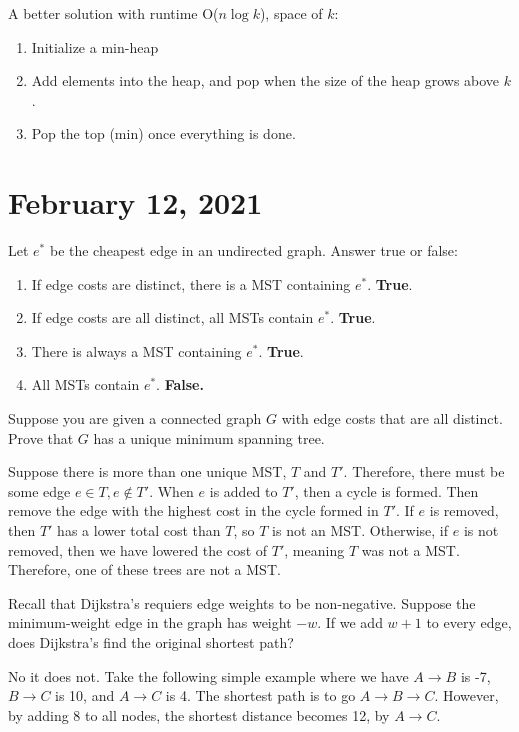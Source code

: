 \documentclass[11pt]{article}
\begin{document}
A better solution with runtime O($n \log k$), space of $k$:
\begin{enumerate}
    \item Initialize a min-heap
    \item Add elements into the heap, and pop when the size of the heap grows above $k$.
    \item Pop the top (min) once everything is done.
\end{enumerate}

\newpage
\section{February 12, 2021}
\begin{exmp}
    Let $e^*$ be the cheapest edge in an undirected graph. Answer true or false: 
    \begin{enumerate}
        \item If edge costs are distinct, there is a MST containing $e^*$. \textbf{True}.
        \item If edge costs are all distinct, all MSTs contain $e^*$. \textbf{True}.
        \item There is always a MST containing $e^*$. \textbf{True}.
        \item All MSTs contain $e^*$. \textbf{False.}
    \end{enumerate}
\end{exmp}
\begin{exmp}
    Suppose you are given a connected graph $G$ with edge costs that are all distinct. Prove that $G$ has a unique minimum spanning tree.
\end{exmp}
    Suppose there is more than one unique MST, $T$ and $T'$. Therefore, there must be some edge $e \in T, e \not\in T'$. When $e$ is added to $T'$, then a cycle is formed. Then remove the edge with the highest cost in the cycle formed in $T'$. If $e$ is removed, then $T'$ has a lower total cost than $T$, so $T$ is not an MST. Otherwise, if $e$ is not removed, then we have lowered the cost of $T'$, meaning $T$ was not a MST. Therefore, one of these trees are not a MST.
    
\begin{exmp}
    Recall that Dijkstra's requiers edge weights to be non-negative. Suppose the minimum-weight edge in the graph has weight $-w$. If we add $w+1$ to every edge, does Dijkstra's find the original shortest path?
\end{exmp}
No it does not. Take the following simple example where we have $A\rightarrow B$ is -7, $B\rightarrow C$ is 10, and $A \rightarrow C$ is 4. The shortest path is to go $A \rightarrow B \rightarrow C$. However, by adding 8 to all nodes, the shortest distance becomes 12, by $A \rightarrow C$.
\end{document}
